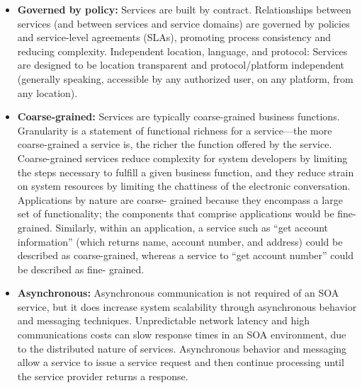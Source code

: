 \documentclass[12pt,a4paper,final,twoside,onecolumn,titlepage]{book}
\begin{document}
\begin{itemize}
\item \textbf{Governed by policy:} Services are built by contract. Relationships between services (and between services and service domains) are governed by policies and service-level agreements (SLAs), promoting process consistency and reducing complexity.
Independent location, language, and protocol: Services are designed to be location transparent and protocol/platform independent (generally speaking, accessible by any authorized user, on any platform, from any location).
\item \textbf{Coarse-grained:} Services are typically coarse-grained business functions. Granularity is a statement of functional richness for a service—the more coarse-grained a service is, the richer the function offered by the service. Coarse-grained services reduce complexity for system developers by limiting the steps necessary to fulfill a given business function, and they reduce strain on system resources by limiting the chattiness of the electronic conversation. Applications by nature are coarse- grained because they encompass a large set of functionality; the components that comprise applications would be fine-grained. Similarly, within an application, a service such as “get account information” (which returns name, account number, and address) could be described as coarse-grained, whereas a service to “get account number” could be described as fine- grained.
\item \textbf{Asynchronous:} Asynchronous communication is not required of an \gls{SOA} service, but it does increase system scalability through asynchronous behavior and messaging techniques. Unpredictable network latency and high communications costs can slow response times in an \gls{SOA} environment, due to the distributed nature of services. Asynchronous behavior and messaging allow a service to issue a service request and then continue processing until the service provider returns a response.
\end{itemize}
\end{document}
